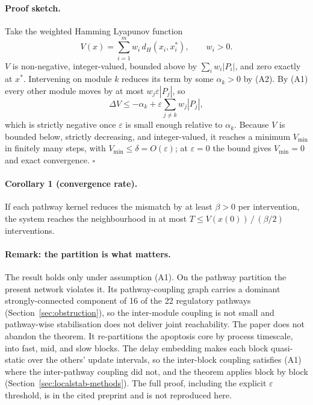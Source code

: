 \paragraph{Proof sketch.} Take the weighted Hamming Lyapunov function
\[
V(x)=\sum_{i=1}^{m} w_i\, d_H\!\left(x_i,x_i^{*}\right),\qquad w_i>0 .
\]
$V$ is non-negative, integer-valued, bounded above by $\sum_i w_i|P_i|$, and zero exactly at $x^{*}$.
Intervening on module $k$ reduces its term by some $\alpha_k>0$ by (A2). By (A1) every other module
moves by at most $w_j\varepsilon|P_j|$, so
\[
\Delta V \le -\alpha_k + \varepsilon\sum_{j\neq k} w_j|P_j| ,
\]
which is strictly negative once $\varepsilon$ is small enough relative to $\alpha_k$. Because $V$ is
bounded below, strictly decreasing, and integer-valued, it reaches a minimum $V_{\min}$ in finitely
many steps, with $V_{\min}\le\delta=O(\varepsilon)$; at $\varepsilon=0$ the bound gives $V_{\min}=0$
and exact convergence. \hfill$\square$

\paragraph{Corollary 1 (convergence rate).} If each pathway kernel reduces the mismatch by at least
$\beta>0$ per intervention, the system reaches the neighbourhood in at most $T \le V(x(0))\,/\,(\beta/2)$
interventions.

\paragraph{Remark: the partition is what matters.} The result holds only under assumption (A1). On
the pathway partition the present network violates it. Its pathway-coupling graph carries a dominant
strongly-connected component of 16 of the 22 regulatory pathways (Section~\ref{sec:obstruction}), so
the inter-module coupling is not small and pathway-wise stabilisation does not deliver joint
reachability. The paper does not abandon the theorem. It re-partitions the apoptosis core by process
timescale, into fast, mid, and slow blocks. The delay embedding makes each block quasi-static over the
others' update intervals, so the inter-block coupling satisfies (A1) where the inter-pathway coupling
did not, and the theorem applies block by block (Section~\ref{sec:localstab-methods}). The full proof,
including the explicit $\varepsilon$ threshold, is in the cited preprint and is not reproduced here.